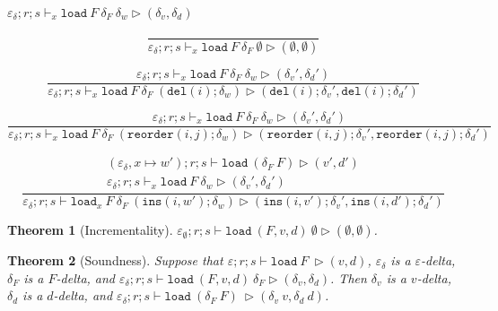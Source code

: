 \documentclass{report}
\theoremstyle{theorem}
\newtheorem{theorem}{Theorem}[section]
\begin{document}
$\boxed{\varepsilon_\delta ; r ; s \vdash_x \mathtt{load}~ F~ \delta_F~\delta_w \rhd (\delta_v,\delta_d)}$

\begin{displaymath}
	\frac{}
	{\varepsilon_\delta ; r ; s \vdash_x \mathtt{load}~F~ \delta_F ~\emptyset \rhd (\emptyset,\emptyset)}
\end{displaymath}

\begin{displaymath}
	\frac{
		\varepsilon_\delta ; r ; s \vdash_x \mathtt{load}~F~ \delta_F ~\delta_w \rhd (\delta_v',\delta_d')
	}
	{\varepsilon_\delta ; r ; s \vdash_x \mathtt{load}~F~ \delta_F ~(\mathtt{del}(i);\delta_w) \rhd (\mathtt{del}(i);\delta_v',\mathtt{del}(i);\delta_d')}
\end{displaymath}

\begin{displaymath}
	\frac{
		\varepsilon_\delta ; r ; s \vdash_x \mathtt{load}~F~ \delta_F ~\delta_w \rhd (\delta_v',\delta_d')
	}
	{\varepsilon_\delta ; r ; s \vdash_x \mathtt{load}~F~ \delta_F ~(\mathtt{reorder}(i,j);\delta_w) \rhd (\mathtt{reorder}(i,j);\delta_v',\mathtt{reorder}(i,j);\delta_d')}
\end{displaymath}

\begin{displaymath}
	\frac{\begin{array}{c}
		(\varepsilon_\delta,x \mapsto w') ; r ; s \vdash \mathtt{load}~ (\delta_F ~F) \rhd (v',d')\\
		\varepsilon_\delta ; r ; s \vdash_x \mathtt{load}~F~\delta_w \rhd (\delta_v',\delta_d')
	\end{array}}
	{\varepsilon_\delta ; r ; s \vdash \mathtt{load}_x~F~ \delta_F ~(\mathtt{ins}(i,w');\delta_w) \rhd (\mathtt{ins}(i,v');\delta_v',\mathtt{ins}(i,d');\delta_d')}
\end{displaymath}

\begin{theorem}[Incrementality]
	$\varepsilon_\emptyset ; r ; s \vdash \mathtt{load}~ (F,v,d)~ \emptyset \rhd (\emptyset,\emptyset)$.
\end{theorem}

\begin{theorem}[Soundness]
	Suppose that $\varepsilon ; r ; s \vdash \mathtt{load}~ F~ \rhd (v,d)$, $\varepsilon_\delta$ is a $\varepsilon$-delta, $\delta_F$ is a $F$-delta, and $\varepsilon_\delta ; r ; s \vdash \mathtt{load}~ (F,v,d)~ \delta_F \rhd (\delta_v,\delta_d)$.
	Then $\delta_v$ is a $v$-delta, $\delta_d$ is a $d$-delta, and $\varepsilon_\delta ; r ; s \vdash \mathtt{load}~ (\delta_F~F)~ \rhd (\delta_v~v,\delta_d~d)$.
\end{theorem}
	
\end{document}
